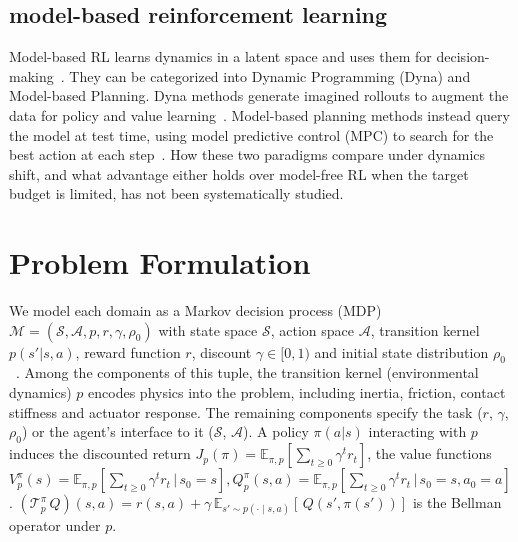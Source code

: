 \documentclass{article} %
\begin{document}
\subsection{model-based reinforcement learning}

Model-based RL learns dynamics in a latent space and uses them for decision-making~\citep{atkeson1997comparison, ha2018recurrent, hafner2019learning, hafner2020mastering, hafner2023mastering, hansen2024td, fujimoto2025towards}. They can be categorized into Dynamic Programming (Dyna) and Model-based Planning. Dyna methods generate imagined rollouts to augment the data for policy and value learning~\citep{sutton1991dyna, janner2019trust, feinberg2018model, buckman2018sample}. Model-based planning methods instead query the model at test time, using model predictive control (MPC) to search for the best action at each step~\citep{williams2015model, chua2018deep, lowrey2018plan, wang2019exploring, chang2026surprising}. How these two paradigms compare under dynamics shift, and what advantage either holds over model-free RL when the target budget is limited, has not been systematically studied.

\section{Problem Formulation}
\label{preliminary}

We model each domain as a Markov decision process (MDP) $\mathcal{M} = (\mathcal{S}, \mathcal{A}, p, r, \gamma, \rho_0)$ with state space $\mathcal{S}$, action space $\mathcal{A}$, transition kernel $p(s' | s, a)$, reward function $r$, discount $\gamma \in [0,1)$ and initial state distribution $\rho_0$~\citep{sutton1998reinforcement}. Among the components of this tuple, the transition kernel (environmental dynamics) $p$ encodes physics into the problem, including inertia, friction, contact stiffness and actuator response. The remaining components specify the task ($r$, $\gamma$, $\rho_0$) or the agent's interface to it ($\mathcal{S}$, $\mathcal{A}$). A policy $\pi(a | s)$ interacting with $p$ induces the discounted return $J_{p}(\pi) = \mathbb{E}_{\pi,p}[\sum_{t\ge0} \gamma^t r_t]$, the value functions $V^{\pi}_{p}(s) = \mathbb{E}_{\pi,p}[\sum_{t\ge0} \gamma^{t} r_t \,|\, s_0 = s], Q^{\pi}_{p}(s,a) = \mathbb{E}_{\pi,p}[\sum_{t\ge0} \gamma^{t} r_t \,|\, s_0 = s, a_0 = a]$. $\left(\mathcal{T}^\pi_{p}\,Q\right)(s,a) = r(s,a) + \gamma\,
\mathbb{E}_{s' \sim p(\cdot \mid s,a)}\!\left[\,Q\!\left(s',
\pi(s')\right)\right]$ is the Bellman operator under $p$.
\end{document}
